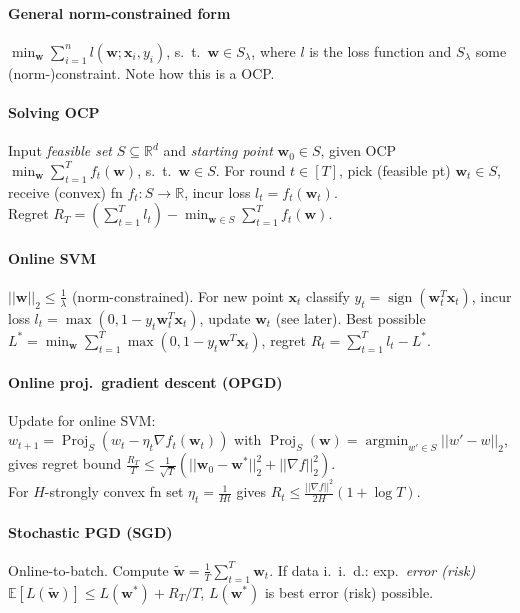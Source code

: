 \documentclass[a4paper, 9pt, DIV=24]{scrartcl}
\DeclareMathOperator{\sign}{sign}
\DeclareMathOperator{\argmin}{argmin}
\DeclareMathOperator{\Proj}{Proj}
\newcommand{\R}{\mathbb{R}}
\newcommand{\E}{\mathbb{E}}
\begin{document}
\begin{twocolumn}
\paragraph{General norm-constrained form} $\min_{\bm w} \sum_{i=1}^{n} l(\bm w; \bm x_i, y_i)$, s.\ t.\ $\bm w \in S_\lambda$, where $l$ is the loss function and $S_\lambda$ some (norm-)constraint. Note how this is a OCP.

\paragraph{Solving OCP}
Input \emph{feasible set} $S \subseteq \R^d$ and \emph{starting point} $\bm w_0 \in S$, given OCP $\min_{\bm w}\sum_{t=1}^{T}f_t(\bm w)$, s.\ t.\ $\bm w \in S$.
For round $t \in [T]$, pick (feasible pt) $\bm w_t \in S$, receive (convex) fn $f_t: S \rightarrow \R$, incur loss $l_t = f_t(\bm w_t)$. \\
Regret $R_T = (\sum_{t=1}^{T} l_t) - \min_{\bm w \in S}\sum_{t=1}^{T}f_t(\bm w)$.

\paragraph{Online SVM}
$||\bm w||_2 \leq \frac{1}{\lambda}$ (norm-constrained). For new point $\bm x_t$ classify $y_t = \sign(\bm w_t^T \bm x_t)$,
incur loss $l_t = \max(0,1-y_t \bm w_t^T \bm x_t)$, update $\bm w_t$ (see later).
Best possible $L^* = \min_{\bm w}\sum_{t=1}^{T}\max(0,1-y_t \bm w^T \bm x_t)$, regret $R_t = \sum_{t=1}^{T} l_t - L^*$.

\paragraph{Online proj.\ gradient descent (OPGD)}
Update for online SVM: \\
$w_{t+1} = \Proj_S(w_t-\eta_t\nabla f_t(\bm w_t))$ with $\Proj_S(\bm w) = \argmin_{w'\in S} ||w'-w||_2$, gives regret bound $\frac{R_T}{T}\leq\frac{1}{\sqrt{T}}(||\bm w_0-\bm w^*||_2^2+||\nabla f||_2^2)$. \\
For $H$-strongly convex fn set $\eta_t = \frac{1}{Ht}$ gives $R_t \leq \frac{||\nabla f||^2}{2H}(1+\log T)$.

\paragraph{Stochastic PGD (SGD)}
Online-to-batch. Compute $\tilde{\bm w} = \frac{1}{T}\sum_{t=1}^{T} \bm w_t$.
If data i.\ i.\ d.: exp.\ \emph{error (risk)} $\E[L(\tilde{\bm w})] \leq L(\bm w^*) + R_T/T$, $L(\bm w^*)$ is best error (risk) possible.


\end{twocolumn}
\end{document}
